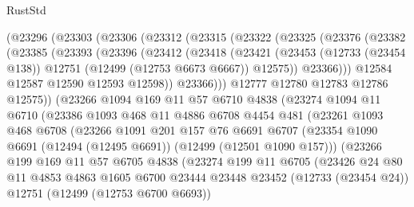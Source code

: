 \begin{lexlean}{RustStd}
\begin{coremodule}
    (@23296
      (@23303
        (@23306
          (@23312
            (@23315
              (@23322
                (@23325
                  (@23376
                    (@23382
                      (@23385
                        (@23393
                          (@23396
                            (@23412
                              (@23418
                                (@23421
                                  (@23453
                                    (@12733 (@23454 @138))
                                    @12751
                                    (@12499 (@12753 @6673 @6667))
                                    @12575))
                                @23366)))
                          @12584
                          @12587
                          @12590
                          @12593
                          @12598))
                      @23366)))
                @12777
                @12780
                @12783
                @12786
                @12575))
            (@23266
              @1094
              @169
              @11
              @57
              @6710
              @4838
              (@23274
                @1094
                @11
                @6710
                (@23386
                  @1093
                  @468
                  @11
                  @4886
                  @6708
                  @4454
                  @481
                  (@23261
                    @1093
                    @468
                    @6708
                    (@23266
                      @1091
                      @201
                      @157
                      @76
                      @6691
                      @6707
                      (@23354 @1090 @6691 (@12494 (@12495 @6691)) (@12499 (@12501 @1090 @157)))
                      (@23266
                        @199
                        @169
                        @11
                        @57
                        @6705
                        @4838
                        (@23274
                          @199
                          @11
                          @6705
                          (@23426
                            @24
                            @80
                            @11
                            @4853
                            @4863
                            @1605
                            @6700
                            @23444
                            @23448
                            @23452
                            (@12733 (@23454 @24))
                            @12751
                            (@12499 (@12753 @6700 @6693))

\end{coremodule}
\end{lexlean}
